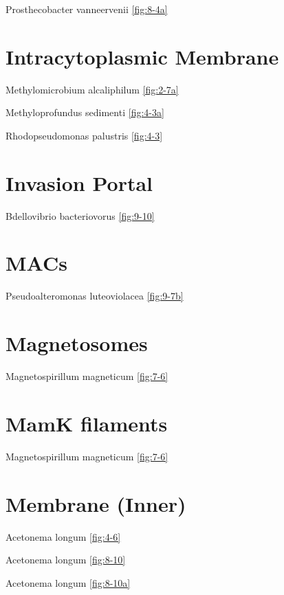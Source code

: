 \documentclass[]{tufte-book}
\begin{document}
Prosthecobacter vanneervenii \ref{fig:8-4a}

\section{\texorpdfstring{\textbf{Intracytoplasmic
Membrane}}{Intracytoplasmic Membrane}}\label{intracytoplasmic-membrane}

Methylomicrobium alcaliphilum \ref{fig:2-7a}

Methyloprofundus sedimenti \ref{fig:4-3a}

Rhodopseudomonas palustris \ref{fig:4-3}

\section{\texorpdfstring{\textbf{Invasion
Portal}}{Invasion Portal}}\label{invasion-portal}

Bdellovibrio bacteriovorus \ref{fig:9-10}

\section{\texorpdfstring{\textbf{MACs}}{MACs}}\label{macs}

Pseudoalteromonas luteoviolacea \ref{fig:9-7b}

\section{\texorpdfstring{\textbf{Magnetosomes}}{Magnetosomes}}\label{magnetosomes}

Magnetospirillum magneticum \ref{fig:7-6}

\section{\texorpdfstring{\textbf{MamK
filaments}}{MamK filaments}}\label{mamk-filaments}

Magnetospirillum magneticum \ref{fig:7-6}

\section{\texorpdfstring{\textbf{Membrane
(Inner)}}{Membrane (Inner)}}\label{membrane-inner}

Acetonema longum \ref{fig:4-6}

Acetonema longum \ref{fig:8-10}

Acetonema longum \ref{fig:8-10a}
\end{document}
